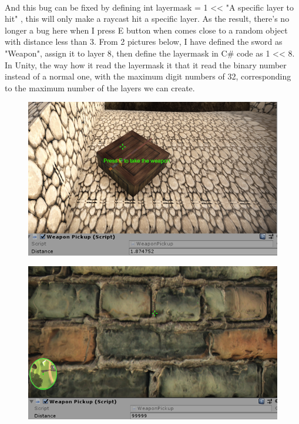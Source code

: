 \documentclass[a4paper, 13pt]{extarticle}
\begin{document}
{\begin{figure}[h]
\begin{minipage}{.5\textwidth}
			\label{fig:test40}
			\centering
		\end{minipage}
	\end{figure} \\
	And this bug can be fixed by defining int layermask = 1 << "A specific layer to hit" , this will only make a raycast hit a specific layer. As the result, there's no longer a bug here when I press E button when comes close to a random object with distance less than 3. From 2 pictures below, I have defined the sword as "Weapon", assign it to layer 8, then define the layermask in C\# code as 1 << 8. In Unity, the way how it read the layermask it that it read the binary number instead of a normal one, with the maximum digit numbers of 32, corresponding to the maximum number of the layers we can create. 
	 \begin{figure}[h!]
	 	\begin{minipage}{.5\textwidth}
	 		\centering
	 		\includegraphics[width=1\linewidth]{intructions/it_works1.png}
	 		\label{fig:test41}
	 	\end{minipage}
 		\begin{minipage}{.5\textwidth}
 		\centering
 		\includegraphics[width=1\linewidth]{intructions/it_works2.png}

\end{minipage}
\end{figure}}
\end{document}
